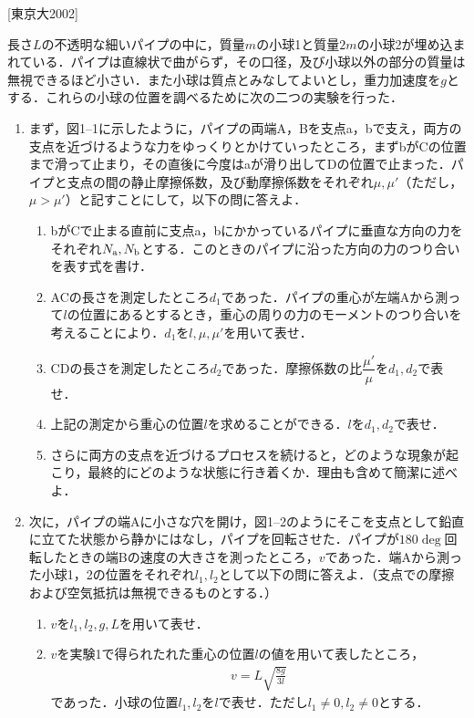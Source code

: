 


\noindent
{} [東京大2002]


長さ$L$の不透明な細いパイプの中に，質量$m$の小球1と質量$2m$の小球2が埋め込まれている．パイプは直線状で曲がらず，その口径，及び小球以外の部分の質量は無視できるほど小さい．また小球は質点とみなしてよいとし，重力加速度を$g$とする．これらの小球の位置を調べるために次の二つの実験を行った．

\begin{enumerate}[label=\textbf{問\arabic*}]
  \item {\hzw}まず，図1--1に示したように，パイプの両端A，Bを支点a，bで支え，両方の支点を近づけるような力をゆっくりとかけていったところ，まずbがCの位置まで滑って止まり，その直後に今度はaが滑り出してDの位置で止まった．パイプと支点の間の静止摩擦係数，及び動摩擦係数をそれぞれ$\mu, \mu'$（ただし，$\mu > \mu'$）と記すことにして，以下の問に答えよ．
  \begin{enumerate}[(1)]
    \item {\hzw}bがCで止まる直前に支点a，bにかかっているパイプに垂直な方向の力をそれぞれ$N_\mathrm{a}, N_\mathrm{b}$とする．このときのパイプに沿った方向の力のつり合いを表す式を書け．
    \item {\hzw}ACの長さを測定したところ$d_1$であった．パイプの重心が左端Aから測って$l$の位置にあるとするとき，重心の周りの力のモーメントのつり合いを考えることにより．$d_1$を$l, \mu, \mu'$を用いて表せ．
    \item {\hzw}CDの長さを測定したところ$d_2$であった．摩擦係数の比$\dfrac{\mu'}{\mu}$を$d_1, d_2$で表せ．
    \item {\hzw}上記の測定から重心の位置$l$を求めることができる．$l$を$d_1, d_2$で表せ．
    \item {\hzw}さらに両方の支点を近づけるプロセスを続けると，どのような現象が起こり，最終的にどのような状態に行き着くか．理由も含めて簡潔に述べよ．
  \end{enumerate}
  \item {\hzw}次に，パイプの端Aに小さな穴を開け，図1--2のようにそこを支点として鉛直に立てた状態から静かにはなし，パイプを回転させた．パイプが$180\deg$回転したときの端Bの速度の大きさを測ったところ，$v$であった．端Aから測った小球1，2の位置をそれぞれ$l_1, l_2$として以下の問に答えよ．（支点での摩擦および空気抵抗は無視できるものとする．）
  \begin{enumerate}[(1)]
    \item {\hzw}$v$を$l_1, l_2, g, L$を用いて表せ．
    \item {\hzw}$v$を実験1で得られたれた重心の位置$l$の値を用いて表したところ，
    \begin{gather*}
      v = L \sqrt{\frac{8g}{3l}}
    \end{gather*}
    であった．小球の位置$l_1, l_2$を$l$で表せ．ただし$l_1 \neq 0, l_2 \neq 0$とする．
  \end{enumerate}
\end{enumerate}

